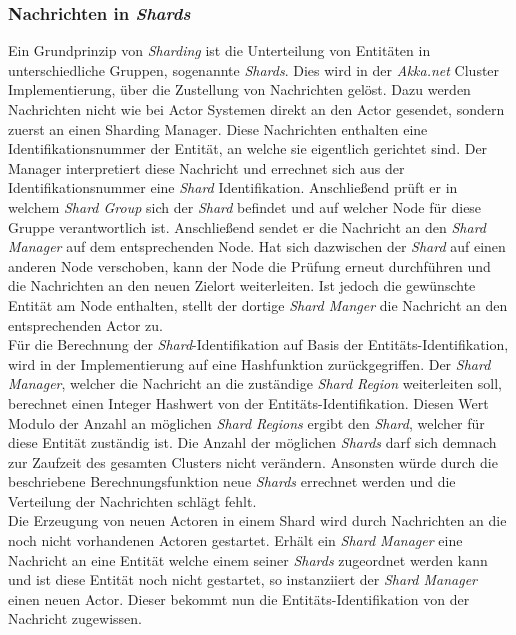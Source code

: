 \subsubsection{Nachrichten in \textit{Shards}}
Ein Grundprinzip von \textit{Sharding} ist die Unterteilung von Entitäten in unterschiedliche Gruppen, sogenannte \textit{Shards}. Dies wird in der \textit{Akka.net} Cluster Implementierung, über die Zustellung von Nachrichten gelöst. Dazu werden Nachrichten nicht wie bei Actor Systemen direkt an den Actor gesendet, sondern zuerst an einen Sharding Manager. Diese Nachrichten enthalten eine Identifikationsnummer der Entität, an welche sie eigentlich gerichtet sind. Der Manager interpretiert diese Nachricht und errechnet sich aus der Identifikationsnummer eine \textit{Shard} Identifikation. Anschließend prüft er in welchem \textit{Shard Group} sich der \textit{Shard} befindet und auf welcher Node für diese Gruppe verantwortlich ist. Anschließend sendet er die Nachricht an den \textit{Shard Manager} auf dem entsprechenden Node. Hat sich dazwischen der \textit{Shard} auf einen anderen Node verschoben, kann der Node die Prüfung erneut durchführen und die Nachrichten an den neuen Zielort weiterleiten. Ist jedoch die gewünschte Entität am Node enthalten, stellt der dortige \textit{Shard Manger} die Nachricht an den entsprechenden Actor zu. \\
Für die Berechnung der \textit{Shard}-Identifikation auf Basis der Entitäts-Identifikation, wird in der Implementierung auf eine Hashfunktion zurückgegriffen. Der \textit{Shard Manager}, welcher die Nachricht an die zuständige \textit{Shard Region} weiterleiten soll, berechnet einen Integer Hashwert von der Entitäts-Identifikation. Diesen Wert Modulo der Anzahl an möglichen \textit{Shard Regions} ergibt den \textit{Shard}, welcher für diese Entität zuständig ist. Die Anzahl der möglichen \textit{Shards} darf sich demnach zur Zaufzeit des gesamten Clusters nicht verändern. Ansonsten würde durch die beschriebene Berechnungsfunktion  neue \textit{Shards} errechnet werden und die Verteilung der Nachrichten schlägt fehlt. \\
Die Erzeugung von neuen Actoren in einem Shard wird durch Nachrichten an die noch nicht vorhandenen Actoren gestartet. Erhält ein \textit{Shard Manager} eine Nachricht an eine Entität welche einem seiner \textit{Shards} zugeordnet werden kann und ist diese Entität noch nicht gestartet, so instanziiert der \textit{Shard Manager} einen neuen Actor. Dieser bekommt nun die Entitäts-Identifikation von der Nachricht zugewissen.
